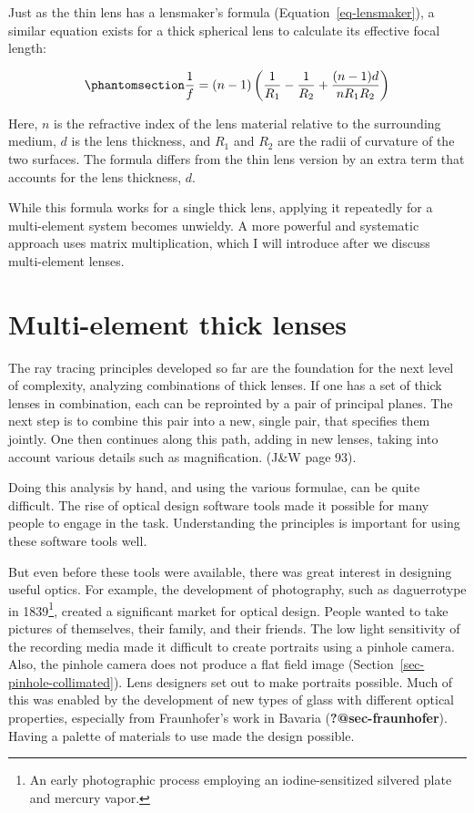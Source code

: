 \documentclass[
  letterpaper,
]{book}
\begin{document}
Just as the thin lens has a lensmaker's formula
(Equation~\ref{eq-lensmaker}), a similar equation exists for a thick
spherical lens to calculate its effective focal length:

\begin{equation}\phantomsection\label{eq-lensmaker-thick}{
\frac{1}{f} = (n - 1) \left ( \frac{1}{R_1} - \frac{1}{R_2} + \frac{(n - 1) d}{n R_1 R_2} \right )
}\end{equation}

Here, \(n\) is the refractive index of the lens material relative to the
surrounding medium, \(d\) is the lens thickness, and \(R_1\) and \(R_2\)
are the radii of curvature of the two surfaces. The formula differs from
the thin lens version by an extra term that accounts for the lens
thickness, \(d\).

While this formula works for a single thick lens, applying it repeatedly
for a multi-element system becomes unwieldy. A more powerful and
systematic approach uses matrix multiplication, which I will introduce
after we discuss multi-element lenses.

\section{Multi-element thick lenses}\label{multi-element-thick-lenses}

The ray tracing principles developed so far are the foundation for the
next level of complexity, analyzing combinations of thick lenses. If one
has a set of thick lenses in combination, each can be reprointed by a
pair of principal planes. The next step is to combine this pair into a
new, single pair, that specifies them jointly. One then continues along
this path, adding in new lenses, taking into account various details
such as magnification. (J\&W page 93).

Doing this analysis by hand, and using the various formulae, can be
quite difficult. The rise of optical design software tools made it
possible for many people to engage in the task. Understanding the
principles is important for using these software tools well.

But even before these tools were available, there was great interest in
designing useful optics. For example, the development of photography,
such as daguerrotype in 1839\footnote{An early photographic process
  employing an iodine-sensitized silvered plate and mercury vapor.},
created a significant market for optical design. People wanted to take
pictures of themselves, their family, and their friends. The low light
sensitivity of the recording media made it difficult to create portraits
using a pinhole camera. Also, the pinhole camera does not produce a flat
field image (Section~\ref{sec-pinhole-collimated}). Lens designers set
out to make portraits possible. Much of this was enabled by the
development of new types of glass with different optical properties,
especially from Fraunhofer's work in Bavaria
(\textbf{?@sec-fraunhofer}). Having a palette of materials to use made
the design possible.
\end{document}
